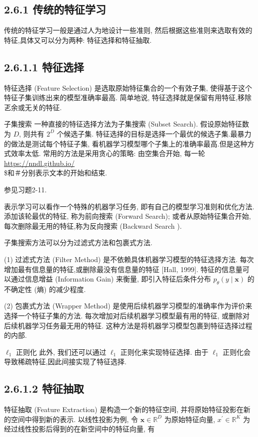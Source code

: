 \documentclass[10pt]{article}
\begin{document}
\subsection*{2.6.1 传统的特征学习}
传统的特征学习一般是通过人为地设计一些准则, 然后根据这些准则来选取有效的特征,具体又可以分为两种: 特征选择和特征抽取.

\subsection*{2.6.1.1 特征选择}
特征选择 (Feature Selection) 是选取原始特征集合的一个有效子集, 使得基于这个特征子集训练出来的模型准确率最高. 简单地说, 特征选择就是保留有用特征,移除乤余或无关的特征.

子集搜索 一种直接的特征选择方法为子集搜索 (Subset Search). 假设原始特征数为 $D$, 则共有 $2^{D}$ 个候选子集. 特征选择的目标是选择一个最优的候选子集.最暴力的做法是测试每个特征子集, 看机器学习模型哪个子集上的准确率最高.但是这种方式效率太低. 常用的方法是采用贪心的策略: 由空集合开始, 每一轮 \href{https://nndl.github.io/}{https://nndl.github.io/}\\
\$和＃分别表示文本的开始和结束.

参见习题2-11.

表示学习可以看作一个特殊的机器学习任务, 即有自己的模型学习准则和优化方法.\\
添加该轮最优的特征, 称为前向搜索 (Forward Search); 或者从原始特征集合开始,每次删除最无用的特征,称为反向搜索 (Backward Search ).

子集搜索方法可以分为过滤式方法和包裹式方法.

(1) 过滤式方法 (Filter Method) 是不依赖具体机器学习模型的特征选择方法. 每次增加最有信息量的特征,或删除最没有信息量的特征 [Hall, 1999]. 特征的信息量可以通过信息增益 (Information Gain) 来衡量, 即引入特征后条件分布 $p_{\theta}(y \mid \boldsymbol{x})$ 的不确定性 (熵) 的减少程度.

(2) 包裹式方法 (Wrapper Method) 是使用后续机器学习模型的准确率作为评价来选择一个特征子集的方法. 每次增加对后续机器学习模型最有用的特征, 或删除对后续机器学习任务最无用的特征. 这种方法是将机器学习模型包裹到特征选择过程的内部.

$\ell_{1}$ 正则化 此外, 我们还可以通过 $\ell_{1}$ 正则化来实现特征选择. 由于 $\ell_{1}$ 正则化会导致稀疏特征,因此间接实现了特征选择.

\subsection*{2.6.1.2 特征抽取}
特征抽取 (Feature Extraction) 是构造一个新的特征空间, 并将原始特征投影在新的空间中得到新的表示. 以线性投影为例, 令 $\boldsymbol{x} \in \mathbb{R}^{D}$ 为原始特征向量, $x^{\prime} \in \mathbb{R}^{K}$ 为经过线性投影后得到的在新空间中的特征向量, 有
\end{document}
